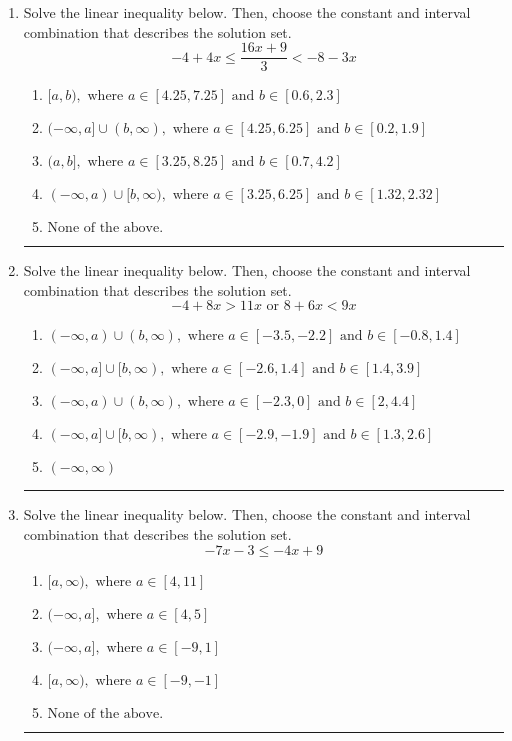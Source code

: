 \documentclass[14pt]{extbook}
\newcommand{\litem}[1]{\item#1\hspace*{-1cm}\rule{\textwidth}{0.4pt}}
\begin{document}
\begin{enumerate}
{\begin{enumerate}[label=\Alph*.]
\end{enumerate} }
\litem{
Solve the linear inequality below. Then, choose the constant and interval combination that describes the solution set.\[ -4 + 4 x \leq \frac{16 x + 9}{3} < -8 - 3 x \]\begin{enumerate}[label=\Alph*.]
\item \( [a, b), \text{ where } a \in [4.25, 7.25] \text{ and } b \in [0.6, 2.3] \)
\item \( (-\infty, a] \cup (b, \infty), \text{ where } a \in [4.25, 6.25] \text{ and } b \in [0.2, 1.9] \)
\item \( (a, b], \text{ where } a \in [3.25, 8.25] \text{ and } b \in [0.7, 4.2] \)
\item \( (-\infty, a) \cup [b, \infty), \text{ where } a \in [3.25, 6.25] \text{ and } b \in [1.32, 2.32] \)
\item \( \text{None of the above.} \)

\end{enumerate} }
\litem{
Solve the linear inequality below. Then, choose the constant and interval combination that describes the solution set.\[ -4 + 8 x > 11 x \text{ or } 8 + 6 x < 9 x \]\begin{enumerate}[label=\Alph*.]
\item \( (-\infty, a) \cup (b, \infty), \text{ where } a \in [-3.5, -2.2] \text{ and } b \in [-0.8, 1.4] \)
\item \( (-\infty, a] \cup [b, \infty), \text{ where } a \in [-2.6, 1.4] \text{ and } b \in [1.4, 3.9] \)
\item \( (-\infty, a) \cup (b, \infty), \text{ where } a \in [-2.3, 0] \text{ and } b \in [2, 4.4] \)
\item \( (-\infty, a] \cup [b, \infty), \text{ where } a \in [-2.9, -1.9] \text{ and } b \in [1.3, 2.6] \)
\item \( (-\infty, \infty) \)

\end{enumerate} }
\litem{
Solve the linear inequality below. Then, choose the constant and interval combination that describes the solution set.\[ -7x -3 \leq -4x + 9 \]\begin{enumerate}[label=\Alph*.]
\item \( [a, \infty), \text{ where } a \in [4, 11] \)
\item \( (-\infty, a], \text{ where } a \in [4, 5] \)
\item \( (-\infty, a], \text{ where } a \in [-9, 1] \)
\item \( [a, \infty), \text{ where } a \in [-9, -1] \)
\item \( \text{None of the above}. \)

\end{enumerate} }
\end{enumerate}
\end{document}
